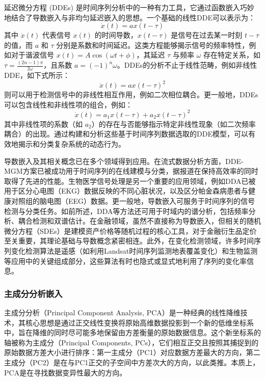 延迟微分方程 (DDEs) \cite{lainscsek2015delay}是时间序列分析中的一种有力工具，它通过函数嵌入巧妙地结合了导数嵌入与非均匀延迟嵌入的思想。一个基础的线性DDE可以表示为：
\begin{equation}
\dot{x}(t) = a x(t-\tau)
\end{equation}
其中 $\dot{x}(t)$ 代表信号 $x(t)$ 的时间导数，$x(t-\tau)$ 是信号在过去某一时刻 $t-\tau$ 的值，而 $a$ 和 $\tau$ 分别是系数和时间延迟。这类方程能够揭示信号的频率特性，例如对于谐波信号 $x(t) = A\cos(\omega t + \phi)$，其延迟 $\tau$ 与频率 $\omega$ 存在特定关系，如 $\tau = \frac{(2n-1)\pi}{2\omega}$，且系数 $a = (-1)^n\omega$。DDEs的分析不止于线性范畴，例如非线性DDE，如下式所示：
\begin{equation}
\dot{x}(t) = a x(t-\tau)^2
\end{equation}
则可以用于检测信号中的非线性相互作用，例如二次相位耦合。更一般地，DDEs可以包含线性和非线性项的组合，例如：
\begin{equation}
\dot{x}(t) = a_1 x(t-\tau) + a_2 x(t-\tau)^2
\end{equation}
其中非线性项的系数（如 $a_2$）的存在与否能够指示特定非线性现象（如二次频率耦合）的出现。通过构建和分析这些基于时间序列数据选取的DDE模型，可以有效地揭示和分类复杂系统的动态行为。



导数嵌入及其相关概念已在多个领域得到应用。在流式数据分析方面，DDE-MGM方案已被成功用于时间序列的在线建模与分类，据报道在保持高效率的同时取得了先进的性能。生物医学信号处理是另一个重要的应用领域，例如DDA已被用于区分心电图（EKG）数据反映的不同心脏状况，以及区分帕金森病患者与健康对照组的脑电图（EEG）数据。更一般地，导数嵌入可服务于时间序列的信号检测与分类任务。如前所述，DDA等方法还可用于时域内的谱分析，包括频率分析、耦合检测和双谱估计。在金融领域，虽然不直接称为导数嵌入，但相关的随机微分方程（SDEs）是建模资产价格等随机过程的核心工具，对于金融衍生品定价至关重要，其理论基础与导数概念紧密相连。此外，在变化检测领域，许多时间序列变化检测算法是遥感（如利用Landsat时间序列监测地表覆盖变化）和生物监测等应用中的关键组成部分，这些算法有时也隐式或显式地利用了序列的变化率信息。
 
\subsubsection{主成分分析嵌入}
主成分分析（Principal Component Analysis, PCA）\cite{broomhead1986extracting}是一种经典的线性降维技术，其核心思想是通过正交线性变换将原始高维数据投影到一个新的低维坐标系中，旨在降维的同时尽可能多地保留由方差衡量的原始数据信息。这个新坐标系的轴被称为主成分（Principal Components, PCs），它们相互正交且按照其捕捉到的原始数据方差大小进行排序：第一主成分（PC1）对应数据方差最大的方向，第二主成分（PC2）是在与PC1正交的子空间中方差次大的方向，以此类推。本质上，PCA是在寻找数据变异性最大的方向。

